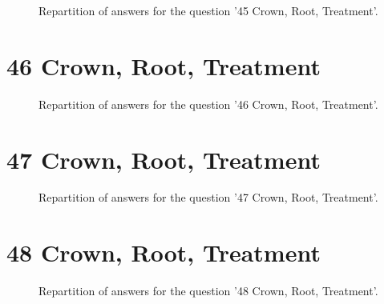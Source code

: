 \documentclass[12pt]{article}
\begin{document}
\label{sec:44}


\begin{figure}[h!]
    \caption{\label{figure:q44-1}Repartition of answers for the question '45
Crown, Root, Treatment'.}
\end{figure}



\clearpage{}
\section{46
Crown, Root, Treatment}

\label{sec:43}


\begin{figure}[h!]
    \caption{\label{figure:q43-1}Repartition of answers for the question '46
Crown, Root, Treatment'.}
\end{figure}



\clearpage{}
\section{47
Crown, Root, Treatment}

\label{sec:42}


\begin{figure}[h!]
    \caption{\label{figure:q42-1}Repartition of answers for the question '47
Crown, Root, Treatment'.}
\end{figure}



\clearpage{}
\section{48
Crown, Root, Treatment}

\label{sec:41}


\begin{figure}[h!]
    \caption{\label{figure:q41-1}Repartition of answers for the question '48
Crown, Root, Treatment'.}
\end{figure}
\end{document}
